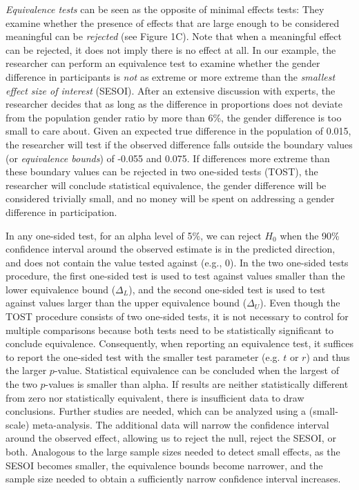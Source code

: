 \documentclass[english,floatsintext,man]{apa6}
\theoremstyle{definition}
\theoremstyle{definition}
\theoremstyle{definition}
\theoremstyle{remark}
\begin{document}
\emph{Equivalence tests} can be seen as the opposite of minimal effects
tests: They examine whether the presence of effects that are large
enough to be considered meaningful can be \emph{rejected} (see Figure
1C). Note that when a meaningful effect can be rejected, it does not
imply there is no effect at all. In our example, the researcher can
perform an equivalence test to examine whether the gender difference in
participants is \emph{not} as extreme or more extreme than the
\emph{smallest effect size of interest} (SESOI). After an extensive
discussion with experts, the researcher decides that as long as the
difference in proportions does not deviate from the population gender
ratio by more than 6\%, the gender difference is too small to care
about. Given an expected true difference in the population of 0.015, the
researcher will test if the observed difference falls outside the
boundary values (or \emph{equivalence bounds}) of -0.055 and 0.075. If
differences more extreme than these boundary values can be rejected in
two one-sided tests (TOST), the researcher will conclude statistical
equivalence, the gender difference will be considered trivially small,
and no money will be spent on addressing a gender difference in
participation.

In any one-sided test, for an alpha level of 5\%, we can reject \(H_0\)
when the 90\% confidence interval around the observed estimate is in the
predicted direction, and does not contain the value tested against
(e.g., 0). In the two one-sided tests procedure, the first one-sided
test is used to test against values smaller than the lower equivalence
bound (\(\Delta_{L}\)), and the second one-sided test is used to test
against values larger than the upper equivalence bound (\(\Delta_{U}\)).
Even though the TOST procedure consists of two one-sided tests, it is
not necessary to control for multiple comparisons because both tests
need to be statistically significant to conclude equivalence.
Consequently, when reporting an equivalence test, it suffices to report
the one-sided test with the smaller test parameter (e.g. \(t\) or \(r\))
and thus the larger \(p\)-value. Statistical equivalence can be
concluded when the largest of the two \(p\)-values is smaller than
alpha. If results are neither statistically different from zero nor
statistically equivalent, there is insufficient data to draw
conclusions. Further studies are needed, which can be analyzed using a
(small-scale) meta-analysis. The additional data will narrow the
confidence interval around the observed effect, allowing us to reject
the null, reject the SESOI, or both. Analogous to the large sample sizes
needed to detect small effects, as the SESOI becomes smaller, the
equivalence bounds become narrower, and the sample size needed to obtain
a sufficiently narrow confidence interval increases.
\end{document}
